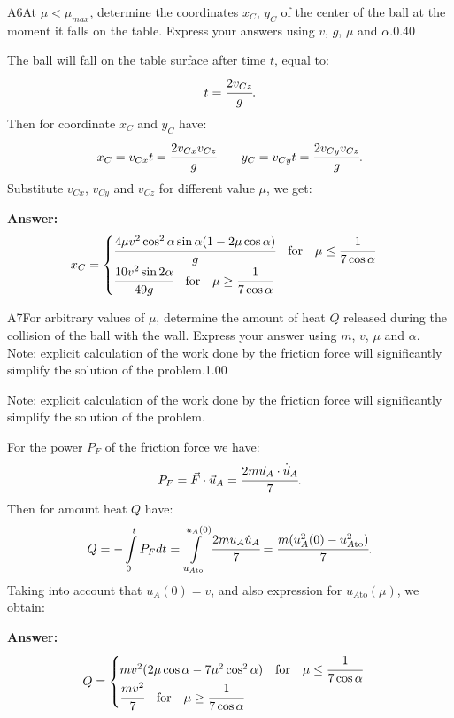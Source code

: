\documentclass[11pt,a4paper]{article}
\begin{document}
\begin{solcard}{A6}{At $\mu<\mu_{max}$, determine the coordinates $x_C$, $y_C$ of the center of the ball at the moment it falls on the table. Express your answers using $v$, $g$, $\mu$ and $\alpha$.}{0.40}

The ball will fall on the table surface after time $t$, equal to: $$t=\cfrac{2v_{Cz}}{g}{.} $$Then for coordinate $x_C$ and $y_C$ have: $$x_C=v_{Cx}t=\cfrac{2v_{Cx}v_{Cz}}{g}\qquad y_C=v_{Cy}t=\cfrac{2v_{Cy}v_{Cz}}{g}{.} $$Substitute $v_{Cx}$, $v_{Cy}$ and $v_{Cz}$ for different value $\mu$, we get:

\par\smallskip\noindent\textbf{Answer:} $$x_C=\begin{cases} \cfrac{4\mu v^2\cos^2\alpha\sin\alpha(1-2\mu\cos\alpha)}{g}\quad\text{for}\quad \mu\leq\cfrac{1}{7\cos\alpha}\\ \cfrac{10v^2\sin 2\alpha}{49g}\quad\text{for}\quad \mu\geq\cfrac{1}{7\cos\alpha} \end{cases} $$
\end{solcard}

\begin{solcard}{A7}{For arbitrary values of $\mu$, determine the amount of heat $Q$ released during the collision of the ball with the wall. Express your answer using $m$, $v$, $\mu$ and $\alpha$. Note: explicit calculation of the work done by the friction force will significantly simplify the solution of the problem.}{1.00}

Note: explicit calculation of the work done by the friction force will significantly simplify the solution of the problem.


For the power $P_F$ of the friction force we have: $$P_F=\vec{F}\cdot\vec{u}_A=\cfrac{2m\vec{u}_A\cdot\dot{\vec{u}}_A}{7}{.} $$Then for amount heat $Q$ have: $$Q=-\int\limits_{0}^{t}P_Fdt=\int\limits_{u_{A\text{to}}}^{u_{A}(0)}\cfrac{2mu_A\dot{u}_A}{7}=\cfrac{m(u^2_A(0)-u^2_{A\text{to}})}{7}{.} $$Taking into account that $u_A(0)=v$, and also expression for $u_{A\text{to}}(\mu)$, we obtain:

\par\smallskip\noindent\textbf{Answer:} $$Q=\begin{cases} mv^2(2\mu\cos\alpha-7\mu^2\cos^2\alpha)\quad\text{for}\quad \mu\leq\cfrac{1}{7\cos\alpha}\\ \cfrac{mv^2}{7}\quad\text{for}\quad \mu\geq\cfrac{1}{7\cos\alpha} \end{cases} $$
\end{solcard}
\end{document}
